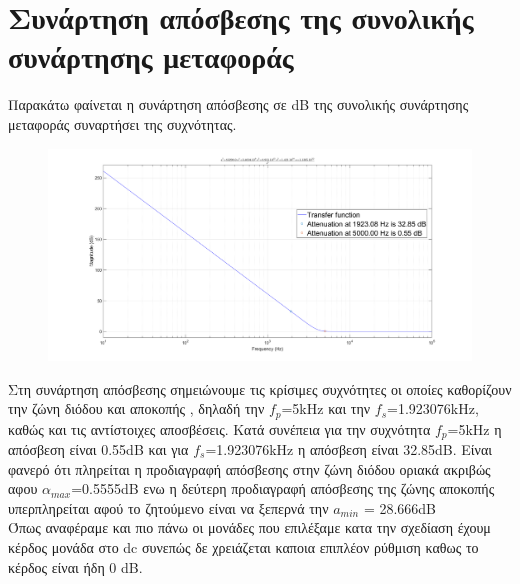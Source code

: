 \documentclass{article}
\begin{document}
{{{\section*{Συνάρτηση απόσβεσης της συνολικής συνάρτησης μεταφοράς} 
Παρακάτω φαίνεται η συνάρτηση απόσβεσης σε dB της συνολικής συνάρτησης μεταφοράς συναρτήσει της συχνότητας. 
\begin{figure}[h!]
\centering
 	\advance\leftskip-3cm
  \includegraphics[width=180mm,scale=2]{thema4/aposvesi.png}
\end{figure}  \color{white}{
Στη συνάρτηση} \color{black} Στη συνάρτηση  απόσβεσης σημειώνουμε τις κρίσιμες συχνότητες οι οποίες καθορίζουν την ζώνη διόδου και αποκοπής , δηλαδή την $f_p$=5kHz  και την $f_s$=1.923076kHz, καθώς και τις αντίστοιχες αποσβέσεις. 
Κατά συνέπεια για την συχνότητα $f_p$=5kHz η απόσβεση είναι 0.55dB και για $f_s$=1.923076kHz η απόσβεση είναι 32.85dB. Eίναι φανερό ότι πληρείται η προδιαγραφή απόσβεσης στην ζώνη διόδου οριακά ακριβώς αφου $α_{max}$=0.5555dB ενω η δεύτερη προδιαγραφή απόσβεσης της ζώνης αποκοπής υπερπληρείται αφού το ζητούμενο είναι να ξεπερνά την $a_{min}$ = 28.666dB\\
Όπως αναφέραμε και πιο πάνω οι μονάδες που επιλέξαμε κατα την σχεδίαση έχουμ κέρδος μονάδα στο dc συνεπώς δε χρειάζεται καποια επιπλέον ρύθμιση καθως το κέρδος είναι ήδη 0 dB.
\clearpage
}}}
\end{document}
